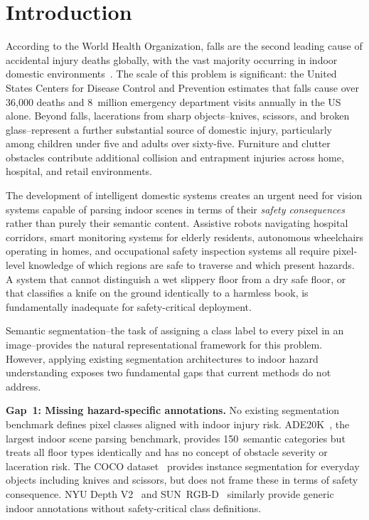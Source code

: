 \section{Introduction}
\label{sec:intro}

According to the World Health Organization, falls are the second
leading cause of accidental injury deaths globally, with the vast
majority occurring in indoor domestic environments~\cite{who2021falls}.
The scale of this problem is significant: the United States Centers
for Disease Control and Prevention estimates that falls cause over
36,000 deaths and 8~million emergency department visits annually in
the US alone. Beyond falls, lacerations from sharp objects--knives,
scissors, and broken glass--represent a further substantial source
of domestic injury, particularly among children under five and adults
over sixty-five. Furniture and clutter obstacles contribute additional
collision and entrapment injuries across home, hospital, and retail
environments.

The development of intelligent domestic systems creates an urgent
need for vision systems capable of parsing indoor scenes in terms
of their \textit{safety consequences} rather than purely their
semantic content. Assistive robots navigating hospital corridors,
smart monitoring systems for elderly residents, autonomous
wheelchairs operating in homes, and occupational safety inspection
systems all require pixel-level knowledge of which regions are safe
to traverse and which present hazards. A system that cannot
distinguish a wet slippery floor from a dry safe floor, or that
classifies a knife on the ground identically to a harmless book,
is fundamentally inadequate for safety-critical deployment.

Semantic segmentation--the task of assigning a class label to every
pixel in an image--provides the natural representational framework
for this problem. However, applying existing segmentation architectures
to indoor hazard understanding exposes two fundamental gaps that
current methods do not address.

\noindent\textbf{Gap~1: Missing hazard-specific annotations.}
No existing segmentation benchmark defines pixel classes aligned
with indoor injury risk. ADE20K~\cite{zhou2017scene}, the largest
indoor scene parsing benchmark, provides 150~semantic categories
but treats all floor types identically and has no concept of
obstacle severity or laceration risk. The COCO
dataset~\cite{lin2014coco} provides instance segmentation for
everyday objects including knives and scissors, but does not frame
these in terms of safety consequence. NYU Depth V2~\cite{silberman2012indoor}
and SUN~RGB-D~\cite{song2015sun} similarly provide generic indoor
annotations without safety-critical class definitions.

